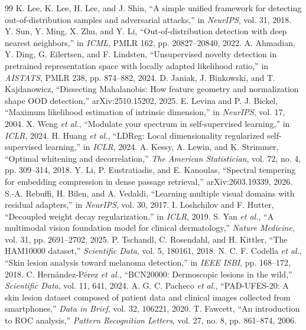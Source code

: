 \documentclass[11pt,a4paper]{article}
\begin{document}
\begin{thebibliography}{99}
 K. Lee, K. Lee, H. Lee, and J. Shin, ``A simple unified framework for detecting out-of-distribution samples and adversarial attacks,'' in \emph{NeurIPS}, vol. 31, 2018.
 Y. Sun, Y. Ming, X. Zhu, and Y. Li, ``Out-of-distribution detection with deep nearest neighbors,'' in \emph{ICML}, PMLR 162, pp. 20827--20840, 2022.
 A. Ahmadian, Y. Ding, G. Eilertsen, and F. Lindsten, ``Unsupervised novelty detection in pretrained representation space with locally adapted likelihood ratio,'' in \emph{AISTATS}, PMLR 238, pp. 874--882, 2024.
 D. Janiak, J. Binkowski, and T. Kajdanowicz, ``Dissecting Mahalanobis: How feature geometry and normalization shape OOD detection,'' arXiv:2510.15202, 2025.
 E. Levina and P. J. Bickel, ``Maximum likelihood estimation of intrinsic dimension,'' in \emph{NeurIPS}, vol. 17, 2004.
 X. Weng \emph{et al.}, ``Modulate your spectrum in self-supervised learning,'' in \emph{ICLR}, 2024.
 H. Huang \emph{et al.}, ``LDReg: Local dimensionality regularized self-supervised learning,'' in \emph{ICLR}, 2024.
 A. Kessy, A. Lewin, and K. Strimmer, ``Optimal whitening and decorrelation,'' \emph{The American Statistician}, vol. 72, no. 4, pp. 309--314, 2018.
 Y. Li, P. Eustratiadis, and E. Kanoulas, ``Spectral tempering for embedding compression in dense passage retrieval,'' arXiv:2603.19339, 2026.
 S.-A. Rebuffi, H. Bilen, and A. Vedaldi, ``Learning multiple visual domains with residual adapters,'' in \emph{NeurIPS}, vol. 30, 2017.
 I. Loshchilov and F. Hutter, ``Decoupled weight decay regularization,'' in \emph{ICLR}, 2019.
 S. Yan \emph{et al.}, ``A multimodal vision foundation model for clinical dermatology,'' \emph{Nature Medicine}, vol. 31, pp. 2691--2702, 2025.
 P. Tschandl, C. Rosendahl, and H. Kittler, ``The HAM10000 dataset,'' \emph{Scientific Data}, vol. 5, 180161, 2018.
 N. C. F. Codella \emph{et al.}, ``Skin lesion analysis toward melanoma detection,'' in \emph{IEEE ISBI}, pp. 168--172, 2018.
 C. Hern\'andez-P\'erez \emph{et al.}, ``BCN20000: Dermoscopic lesions in the wild,'' \emph{Scientific Data}, vol. 11, 641, 2024.
 A. G. C. Pacheco \emph{et al.}, ``PAD-UFES-20: A skin lesion dataset composed of patient data and clinical images collected from smartphones,'' \emph{Data in Brief}, vol. 32, 106221, 2020.
 T. Fawcett, ``An introduction to ROC analysis,'' \emph{Pattern Recognition Letters}, vol. 27, no. 8, pp. 861--874, 2006.

\end{thebibliography}
\end{document}
